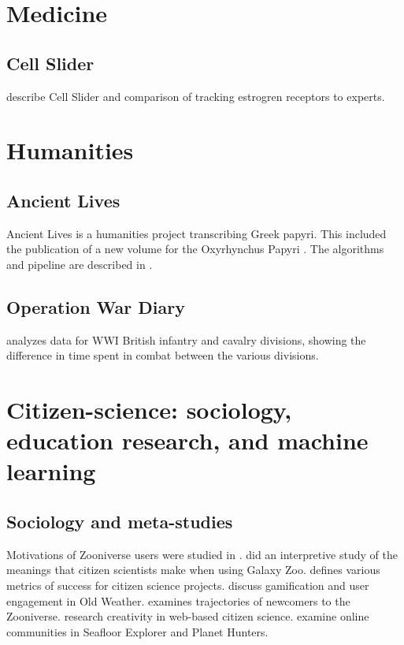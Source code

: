 \documentclass[twocolumn]{aastex6}
\begin{document}
\section{Medicine}

\subsection{Cell Slider}

\citet{can15} describe Cell Slider and comparison of tracking estrogren receptors to experts.

\section{Humanities}

\subsection{Ancient Lives}

Ancient Lives is a humanities project transcribing Greek papyri. This included the publication of a new volume for the Oxyrhynchus Papyri \citep{bru13}. The algorithms and pipeline are described in \citet{wil14a,wil14}.

\subsection{Operation War Diary}

\citet{gra16} analyzes data for WWI British infantry and cavalry divisions, showing the difference in time spent in combat between the various divisions.

\section{Citizen-science: sociology, education research, and machine learning}

\subsection{Sociology and meta-studies}

Motivations of Zooniverse users were studied in \citet{rad10,rad13,jac15}. \citet{man11b} did an interpretive study of the meanings that citizen scientists make when using Galaxy Zoo. \citet{cox15} defines various metrics of success for citizen science projects. \citet{eve13,eve14,gre14} discuss gamification and user engagement in Old Weather. \citet{jac16} examines trajectories of newcomers to the Zooniverse. \citet{jen13} research creativity in web-based citizen science. \citet{luc14,mug14,mug15} examine online communities in Seafloor Explorer and Planet Hunters.
\end{document}
